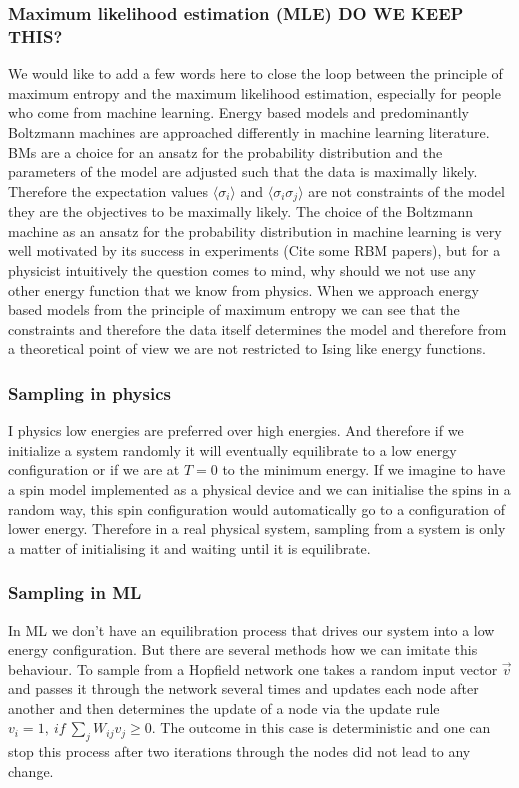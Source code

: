 \documentclass[nofootinbib, superscriptaddress, prl]{revtex4}
\begin{document}
\subsubsection{Maximum likelihood estimation (MLE) DO WE KEEP THIS?}

We would like to add a few words here to close the loop between the principle of maximum entropy and the maximum likelihood estimation, especially for people who come from machine learning.
Energy based models and predominantly Boltzmann machines are approached differently in machine learning literature. BMs are a choice for an ansatz for the probability distribution and the parameters of the model are adjusted such that the data is maximally likely. Therefore the expectation values $\langle \sigma_i \rangle$ and  $\langle \sigma_i \sigma_j \rangle$ are not constraints of the model they are the objectives to be maximally likely.
The choice of the Boltzmann machine as an ansatz for the probability distribution in machine learning is very well motivated by its success in experiments (Cite some RBM papers), but for a physicist intuitively the question comes to mind, why should we not use any other energy function that we know from physics. When we approach energy based models from the principle of maximum entropy we can see that the constraints and therefore the data itself determines the model and therefore from a theoretical point of view we are not restricted to Ising like energy functions.

\subsubsection{Sampling in physics}

I physics low energies are preferred over high energies. 
And therefore if we initialize a system randomly it will eventually equilibrate to a low energy configuration or if we are at $T=0$ to the minimum energy.
If we imagine to have a spin model implemented as a physical device and we can initialise the spins in a random way, this spin configuration would automatically go to a configuration of lower energy.
Therefore in a real physical system, sampling from a system is only a matter of initialising it and waiting until it is equilibrate.

\subsubsection{Sampling in ML}

In ML we don't have an equilibration process that drives our system into a low energy configuration. But there are several methods how we can imitate this behaviour.
To sample from a Hopfield network one takes a random input vector $\vec{v}$ and passes it through the network several times and updates each node after another and then determines the update of a node via the update rule $v_i = 1,~ if~\sum_j W_{ij} v_j \geq 0$. The outcome in this case is deterministic and one can stop this process after two iterations through the nodes did not lead to any change.
\end{document}
